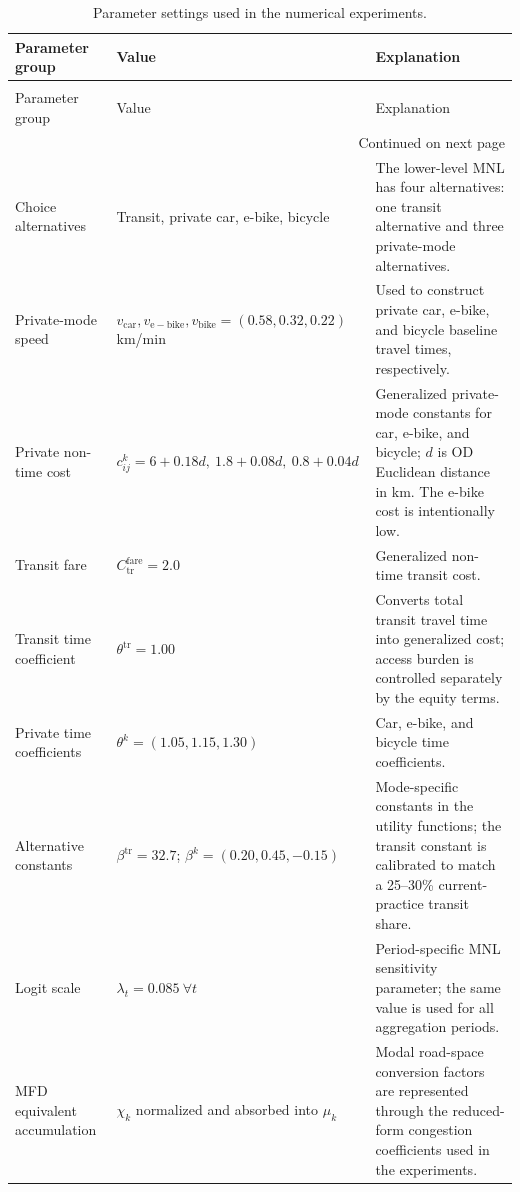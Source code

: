 \scriptsize
\begin{longtable}{p{}p{}p{}}
\caption{Parameter settings used in the numerical experiments.\label{tab:appendix_parameters}} \\
\toprule
Parameter group & Value & Explanation \\
\midrule
\endfirsthead
\caption[]{Parameter settings used in the numerical experiments.} \\
\toprule
Parameter group & Value & Explanation \\
\midrule
\endhead
\midrule
\multicolumn{3}{r}{Continued on next page} \\
\midrule
\endfoot
\bottomrule
\endlastfoot
Choice alternatives & Transit, private car, e-bike, bicycle & The lower-level MNL has four alternatives: one transit alternative and three private-mode alternatives. \\
Private-mode speed & \(v_{\mathrm{car}},v_{\mathrm{e-bike}},v_{\mathrm{bike}}=(0.58,0.32,0.22)\) km/min & Used to construct private car, e-bike, and bicycle baseline travel times, respectively. \\
Private non-time cost & \(c^k_{ij}=6+0.18d,\ 1.8+0.08d,\ 0.8+0.04d\) & Generalized private-mode constants for car, e-bike, and bicycle; \(d\) is OD Euclidean distance in km. The e-bike cost is intentionally low. \\
Transit fare & \(C^{\mathrm{fare}}_{\mathrm{tr}}=2.0\) & Generalized non-time transit cost. \\
Transit time coefficient & \(\theta^{\mathrm{tr}}=1.00\) & Converts total transit travel time into generalized cost; access burden is controlled separately by the equity terms. \\
Private time coefficients & \(\theta^k=(1.05, 1.15, 1.30)\) & Car, e-bike, and bicycle time coefficients. \\
Alternative constants & \(\beta^{\mathrm{tr}}=32.7\); \(\beta^k=(0.20, 0.45, -0.15)\) & Mode-specific constants in the utility functions; the transit constant is calibrated to match a 25--30\% current-practice transit share. \\
Logit scale & \(\lambda_t=0.085\ \forall t\) & Period-specific MNL sensitivity parameter; the same value is used for all aggregation periods. \\
MFD equivalent accumulation & \(\chi_k\) normalized and absorbed into \(\mu_k\) & Modal road-space conversion factors are represented through the reduced-form congestion coefficients used in the experiments. \\

\end{longtable}
